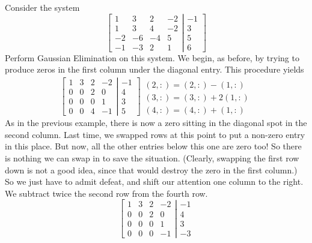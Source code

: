 \begin{example} Consider the system 
\[
\left[
\begin{array}{cccc}
1&3&2&-2 \\
1&3&4&-2 \\
-2&-6&-4&5 \\
-1&-3&2&1
\end{array} \right| \left.
\begin{array}{c}
-1 \\ 3 \\ 5 \\ 6 
\end{array}
\right]
\]
Perform Gaussian Elimination on this system. {\rm We begin, as before,
by trying to produce zeros in the first column under the diagonal
entry. This procedure yields
\[
\left[
\begin{array}{cccc}
1&3&2&-2 \\
0&0&2&0 \\
0&0&0&1 \\
0&0&4&-1
\end{array} \right| \left.
\begin{array}{c}
-1 \\ 4 \\ 3 \\ 5 
\end{array}
\right]
\begin{array}{c} 
 \\(2,:)=(2,:)-(1,:) \\(3,:)=(3,:)+2(1,:)  \\ (4,:)=(4,:)+(1,:)
\end{array}
\]
As in the previous example, there is now a zero sitting in the
diagonal spot in the second column. Last time, we swapped rows at this
point to put a non-zero entry in this place. But now, all the other
entries below this one are zero too! So there is nothing we can swap
in to save the situation. (Clearly, swapping the first row down is not
a good idea, since that would destroy the zero in the first column.)
So we just have to admit defeat, and shift our attention one column to
the right. We subtract twice the second row from the fourth row.
\[
\left[
\begin{array}{cccc}
1&3&2&-2 \\
0&0&2&0 \\
0&0&0&1 \\
0&0&0&-1
\end{array} \right| \left.
\begin{array}{c}
-1 \\ 4 \\ 3 \\ -3 

\end{array}\]}
\end{example}
